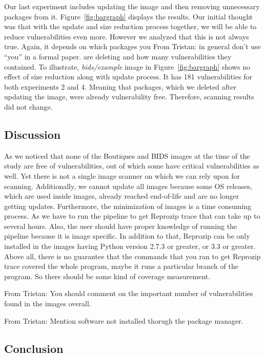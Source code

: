 \documentclass[a4paper,num-refs]{oup-contemporary}
\newcommand{\tristan}[1]{\color{blue}From Tristan: #1\color{black}}
\begin{document}
Our last experiment includes updating the image and then removing unnecessary packages from it.
Figure~\ref{fig:bargraph} displays the results. 
Our initial thought was that with the update and size reduction process together, we will be able to
reduce vulnerabilities even more. However
we analyzed that this is not always true. Again, it depends on which packages you \tristan{in general don't use ``you'' in a 
formal paper.} are deleting and how
many vulnerabilities they contained. To illustrate, \textit{bids/example} image in Figure~\ref{fig:bargraph}
shows no effect of size reduction along with update process. It has 181 vulnerabilities for both experiments 2 and 4.
Meaning that packages, which we deleted after updating the image, were already vulnerability free. Therefore,
scanning results did not change.

\subsection{Discussion}

As we noticed that none of the Boutiques and BIDS images at the time of the study are free of vulnerabilities, out of which
some have critical vulnerabilities as well. Yet there is not a single image scanner on which we can rely upon for
scanning. Additionally, we cannot update all images because some OS releases, which are used inside images, 
already reached end-of-life and are
no longer getting updates. Furthermore, the minimization of images is a time consuming process. As we have to run
the pipeline to get Reprozip trace that can take up to several hours. Also, the user should have proper knowledge
of running the pipeline because it is image specific. In addition to that, Reprozip can be only installed
in the images having Python version 2.7.3 or greater, or 3.3 or greater. Above all, there is no guarantee that
the commands that you ran to get Reprozip trace covered the whole program, maybe it runs a particular
branch of the program. So there should be some kind of coverage measurement.

\tristan{You should comment on the important number of vulnerabilities found in the images overall.}

\tristan{Mention software not installed thorugh the package manager.}

\subsection{Conclusion}
\end{document}
